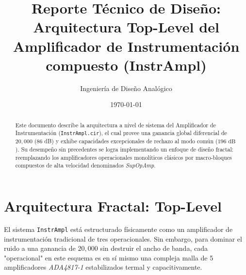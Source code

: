 \documentclass[11pt, a4paper]{article}
\title{\textbf{Reporte Técnico de Diseño: Arquitectura Top-Level del Amplificador de Instrumentación compuesto (InstrAmpl)}}
\author{Ingeniería de Diseño Analógico}
\date{\today}
\begin{document}
\maketitle

\begin{abstract}
Este documento describe la arquitectura a nivel de sistema del Amplificador de Instrumentación (\texttt{InstrAmpl.cir}), el cual provee una ganancia global diferencial de $20,000$ (86 dB) y exhibe capacidades excepcionales de rechazo al modo común ($196\text{ dB}$). Su desempeño sin precedentes se logra implementando un enfoque de diseño fractal: reemplazando los amplificadores operacionales monolíticos clásicos por macro-bloques compuestos de alta velocidad denominados \textit{SupOpAmp}.
\end{abstract}

\tableofcontents
\newpage

\section{Arquitectura Fractal: Top-Level}

El sistema \texttt{InstrAmpl} está estructurado físicamente como un amplificador de instrumentación tradicional de tres operacionales. Sin embargo, para dominar el ruido a una ganancia de $20,000$ sin destruir el ancho de banda, cada "operacional" en este esquema es en sí mismo una compleja malla de 5 amplificadores \textit{ADA4817-1} estabilizados termal y capacitivamente.
\end{document}
